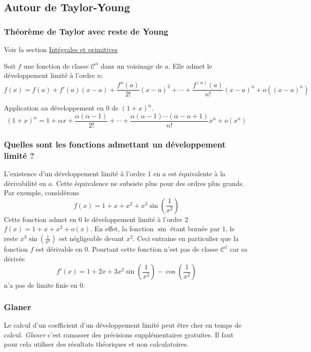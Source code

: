 \subsection{Autour de Taylor-Young}
\subsubsection{Théorème de Taylor avec reste de Young}
Voir la section \href{\baseurl C2190.pdf}{Intégrales et primitives}
\begin{prop}
Soit $f$ une fonction de classe $\mathcal{C}^n$ dans un voisinage de $a$. Elle admet le développement limité à l'ordre $n$:
\begin{displaymath}
f(x) = f(a) + f'(a)(x-a)+\frac{f''(a)}{2!}(x-a)^2 + \cdots + \frac{f^{(n)}(a)}{n!}(x-a)^n + o((x-a)^n)
\end{displaymath}
\end{prop}

Application au développement en $0$ de $(1+x)^\alpha$.
\begin{displaymath}
(1+x)^{\alpha} = 1 + \alpha x + \frac{\alpha(\alpha -1)}{2!} + \cdots + 
\frac{\alpha(\alpha -1)\cdots(\alpha -n +1)}{n!} x^n + o(x^n)
\end{displaymath}


\subsubsection{Quelles sont les fonctions admettant un développement limité ?}
L'existence d'un développement limité à l'ordre 1 en $a$ est équivalente à la dérivabilité en $a$. Cette équivalence ne subsiste plus pour des ordres plus grands. Par exemple, considérons
\begin{displaymath}
 f(x) = 1+x+x^2 + x^3\sin(\frac{1}{x^2})
\end{displaymath}
Cette fonction admet en $0$ le développement limité à l'ordre 2 $f(x)=1+x+x^2+o(x)$. En effet, la fonction $\sin$ étant bornée par $1$, le reste $x^3\sin(\frac{1}{x^2})$ est négligeable devant $x^2$. Ceci entraine en particulier que la fonction $f$ est dérivable en $0$. Pourtant cette fonction n'est pas de classe $\mathcal C^1$ car sa dérivée
\begin{displaymath}
 f'(x)= 1+2x+3x^2\sin(\frac{1}{x^2}) - \cos(\frac{1}{x^2})
\end{displaymath}
n'a pas de limite finie en $0$.

\subsubsection{Glaner}
Le calcul d'un coefficient d'un développement limité peut être cher en temps de calcul. \emph{Glaner} c'est ramasser des précisions supplémentaires \og gratuites\fg. Il faut pour cela utiliser des résultats théoriques et non calculatoires.
